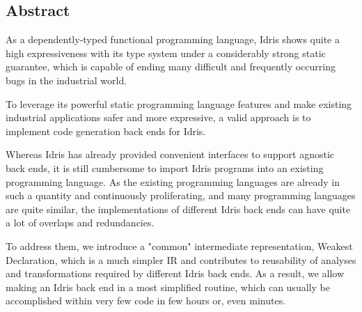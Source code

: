 \documentclass[a1,portrait]{a1poster}
\begin{document}
\begin{multicols}{2} %




\section*{Abstract}

As a dependently-typed functional programming language, Idris shows
quite a high expressiveness with its type system under a considerably strong static guarantee,
which is capable of ending many difficult and frequently occurring bugs in the industrial world.

To leverage its powerful static programming language features and make
existing industrial applications safer and more expressive,
a valid approach is to implement code generation back ends for Idris.

Whereas Idris has already provided convenient interfaces to support
agnostic back ends, it is still cumbersome to import Idris programs
into an existing programming language. As the existing programming languages are already
in such a quantity and continuously proliferating,
and many programming languages are quite similar, the implementations
of different Idris back ends can have quite a lot of overlaps and redundancies.
  
To address them, we introduce a "common" intermediate representation, Weakest Declaration,
which is a much simpler IR and contributes to reusability of analyses and transformations
required by different Idris back ends. As a result, we allow making an Idris back end
in a most simplified routine, which can usually be accomplished within very few code
in few hours or, even minutes.



\end{multicols}
\end{document}
